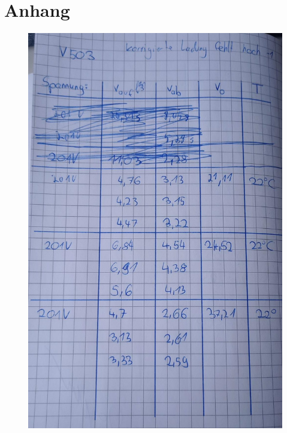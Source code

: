 \section{Anhang}

\begin{figure}[H]
    \centering
    \includegraphics[width=\textwidth]{Bilder/V503.1.jpeg}
\end{figure}

